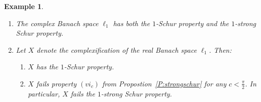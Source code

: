 \documentclass{amsart}
\numberwithin{equation}{section}
\newtheorem{example}[thm]{Example}
\theoremstyle{definition}
\begin{document}
\begin{example}\label{ex:ell_1-complexification}
     \begin{enumerate}[$(1)$]
       \item The complex Banach space $\ell_1$ has both the $1$-Schur property and the $1$-strong Schur property.
      \item Let $X$ denote the complexification of the real Banach space $\ell_1$. Then:
    \begin{enumerate}[$(a)$]
        \item $X$ has the $1$-Schur property.
        \item $X$ fails property $(vi_c)$ from Propostion~\ref{P:strongschur} for any $c<\frac\pi2$. In particular, $X$ fails the $1$-strong Schur property.
    \end{enumerate}
       \end{enumerate}
\end{example}
\end{document}
